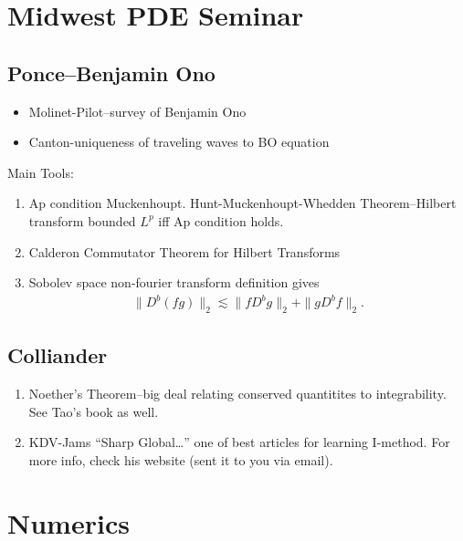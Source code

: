 \documentclass[12pt,reqno]{amsart}
\numberwithin{equation}{section}  %
\begin{document}
  \section{Midwest PDE Seminar} 
  \label{sec:mpde}
  \subsection{Ponce--Benjamin Ono} 
  \label{ssec:ponce-benono}
  \begin{itemize}
    \item{}
      Molinet-Pilot--survey of Benjamin Ono
    \item{}
      Canton-uniqueness of traveling waves to BO equation
  \end{itemize}
  Main Tools:
  \begin{enumerate}
    \item{}
      Ap condition Muckenhoupt. Hunt-Muckenhoupt-Whedden Theorem--Hilbert transform bounded $L^{p}$ iff Ap condition holds.
    \item{}
      Calderon Commutator Theorem for Hilbert Transforms
    \item{}
      Sobolev space non-fourier transform definition gives
      \begin{equation*}
	\begin{split}
	  \| D^{b}(fg) \|_{2} \lesssim \| fD^{b}g \|_{2} + \| gD^{b}f \|_{2}.
	\end{split}
      \end{equation*}
  \end{enumerate}
  \subsection{Colliander} 
  \label{ssec:col-web}
  \begin{enumerate}
    \item{} Noether's Theorem--big deal relating conserved quantitites to integrability. See Tao's book as well.
    \item{} KDV-Jams ``Sharp Global\ldots'' one of best articles for learning I-method. For more info, check his website (sent it to you via email).
  \end{enumerate}
  \section{Numerics} 
  \label{sec:numerics}
\end{document}
